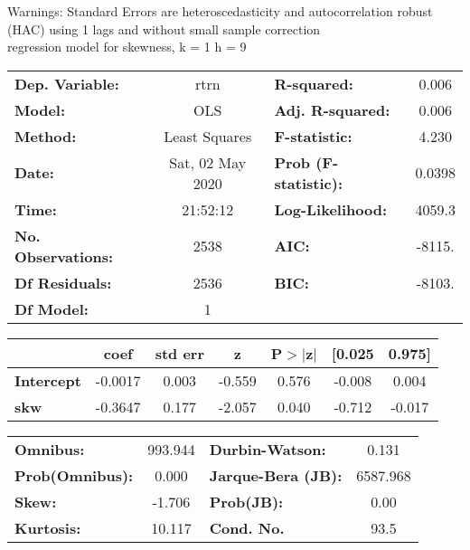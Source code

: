 Warnings: \newline
 [1] Standard Errors are heteroscedasticity and autocorrelation robust (HAC) using 1 lags and without small sample correction\\ 

regression model for skewness, k = 1 h = 9\begin{center}
\begin{tabular}{lclc}
\toprule
\textbf{Dep. Variable:}    &       rtrn       & \textbf{  R-squared:         } &     0.006   \\
\textbf{Model:}            &       OLS        & \textbf{  Adj. R-squared:    } &     0.006   \\
\textbf{Method:}           &  Least Squares   & \textbf{  F-statistic:       } &     4.230   \\
\textbf{Date:}             & Sat, 02 May 2020 & \textbf{  Prob (F-statistic):} &   0.0398    \\
\textbf{Time:}             &     21:52:12     & \textbf{  Log-Likelihood:    } &    4059.3   \\
\textbf{No. Observations:} &        2538      & \textbf{  AIC:               } &    -8115.   \\
\textbf{Df Residuals:}     &        2536      & \textbf{  BIC:               } &    -8103.   \\
\textbf{Df Model:}         &           1      & \textbf{                     } &             \\
\bottomrule
\end{tabular}
\begin{tabular}{lcccccc}
                   & \textbf{coef} & \textbf{std err} & \textbf{z} & \textbf{P$> |$z$|$} & \textbf{[0.025} & \textbf{0.975]}  \\
\midrule
\textbf{Intercept} &      -0.0017  &        0.003     &    -0.559  &         0.576        &       -0.008    &        0.004     \\
\textbf{skw}       &      -0.3647  &        0.177     &    -2.057  &         0.040        &       -0.712    &       -0.017     \\
\bottomrule
\end{tabular}
\begin{tabular}{lclc}
\textbf{Omnibus:}       & 993.944 & \textbf{  Durbin-Watson:     } &    0.131  \\
\textbf{Prob(Omnibus):} &   0.000 & \textbf{  Jarque-Bera (JB):  } & 6587.968  \\
\textbf{Skew:}          &  -1.706 & \textbf{  Prob(JB):          } &     0.00  \\
\textbf{Kurtosis:}      &  10.117 & \textbf{  Cond. No.          } &     93.5  \\
\bottomrule
\end{tabular}
\end{center}

